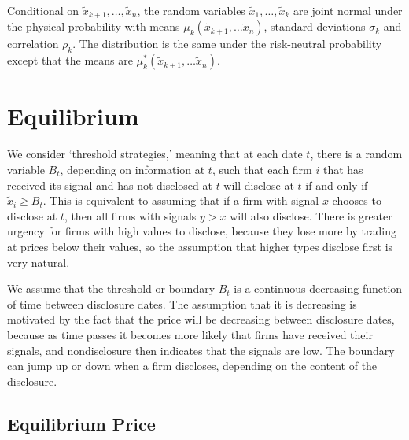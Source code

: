 \documentclass[authoryear,letterpaper,english,12pt]{elsarticle}
\begin{document}
\begin{lemma}
Conditional on $\tilde x_{k+1}, \ldots, \tilde x_n$, the random variables $\tilde x_{1}, \ldots, \tilde x_k$ are joint normal under the physical probability with means $\mu_k(\tilde x_{k+1}, \ldots \tilde x_n)$, standard deviations $\sigma_k$ and correlation $\rho_k$.  The distribution is the same under the risk-neutral probability except that the means are $\mu^*_{k}(\tilde x_{k+1}, \ldots \tilde x_n)$.
\end{lemma}

\section{Equilibrium}

We consider `threshold strategies,' meaning that at each date $t$, there is a random variable $B_t$, depending on information at $t$, such that each firm $i$ that has received its signal and has not disclosed at $t$ will disclose at $t$ if and only if $\tilde x_i \ge B_t$.  This is equivalent to assuming that if a firm with signal $x$ chooses to disclose at $t$, then all firms with signals $y>x$ will also  disclose.  There is greater urgency for firms with high values to disclose, because they lose more by trading at prices below their values, so the assumption that higher types disclose first is very natural.

We assume that the threshold or boundary $B_t$ is a continuous decreasing function of time between disclosure dates.  The assumption that it is decreasing is motivated by the fact that the price will be decreasing between disclosure dates, because as time passes it becomes more likely that firms have received their signals, and nondisclosure then indicates that the signals are low.  The boundary can jump up or down when a firm discloses, depending on the content of the disclosure.

%
\subsection{Equilibrium Price}
%
\end{document}
